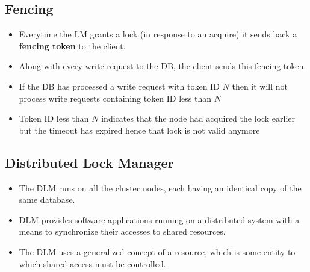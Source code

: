 \documentclass{article}
\begin{document}
\subsection{Fencing}
\begin{itemize}
    \item Everytime the LM grants a lock (in response to an acquire) it sends back a \textbf{fencing token} to the client. 
    
    \item Along with every write request to the DB, the client sends this fencing token. 
    
    \item If the DB has processed a write request with token ID $N$ then it will not process write requests containing token ID less than $N$ 
    
    \item Token ID less than $N$ indicates that the node had acquired the lock earlier but the timeout has expired hence that lock is not valid anymore
\end{itemize}

\subsection{Distributed Lock Manager}
\begin{itemize}
    \item The DLM runs on all the cluster nodes, each having an identical copy of the same database. 
    
    \item DLM provides software applications running on a distributed system with a means to synchronize their accesses to shared resources.
    
    \item The DLM uses a generalized concept of a resource, which is some entity to which shared access must be controlled. 
\end{itemize}
\end{document}
